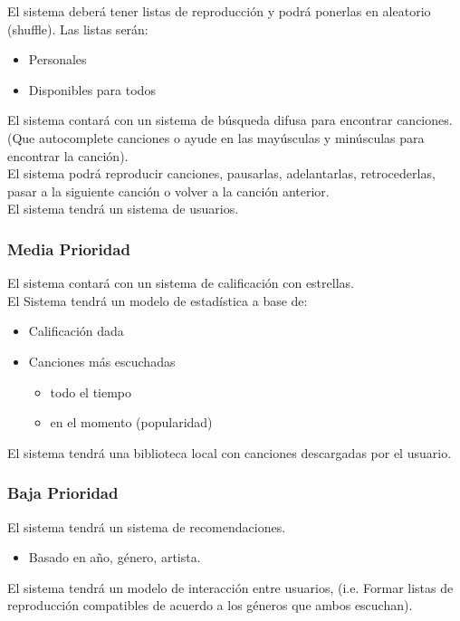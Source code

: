 \documentclass[12pt]{article}
\newcounter{ni}
\begin{document}
El sistema deberá tener listas de reproducción  y podrá ponerlas en aleatorio (shuffle). Las listas serán:
\begin{itemize}
    \item Personales
    \item Disponibles para todos
\end{itemize} 

El sistema contará con un sistema de búsqueda difusa para encontrar canciones. (Que autocomplete canciones o ayude en las mayúsculas y minúsculas para encontrar la canción). \\

El sistema podrá reproducir canciones, pausarlas, adelantarlas, retrocederlas, pasar a la siguiente canción o volver a la canción anterior. \\

El sistema tendrá un sistema de usuarios.


\subsubsection{Media Prioridad}

El sistema contará con un sistema de calificación con estrellas. \\

El Sistema tendrá un modelo de estadística a base de:
\begin{itemize}
    \item Calificación dada
    \item Canciones más escuchadas
    \begin{itemize}
        \item todo el tiempo
        \item en el momento (popularidad)
    \end{itemize}
\end{itemize}

El sistema tendrá una biblioteca local con canciones descargadas por el usuario.


\subsubsection{Baja Prioridad}
El sistema tendrá un sistema de recomendaciones.
\begin{itemize}
    \item Basado en año, género, artista.
\end{itemize}

El sistema tendrá un modelo de interacción entre usuarios, (i.e. Formar listas de reproducción compatibles de acuerdo a los géneros que ambos escuchan). \\
\end{document}
